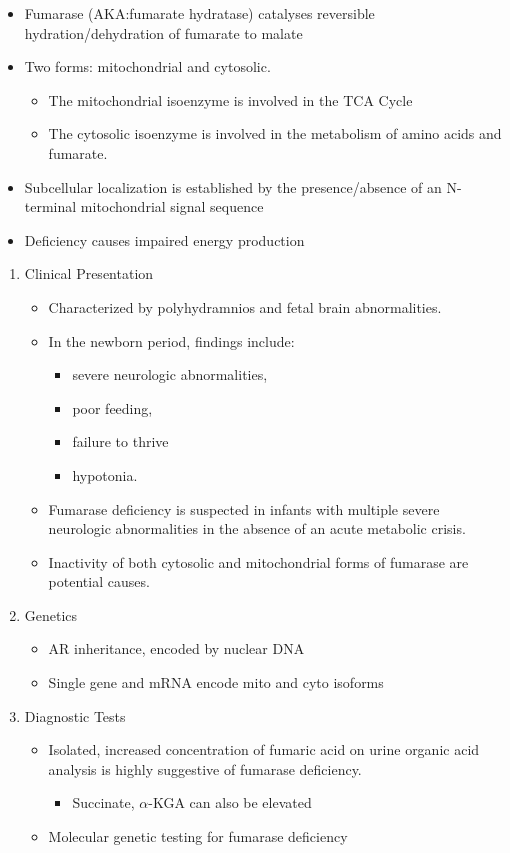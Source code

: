 \documentclass{scrartcl}
\begin{document}
\begin{itemize}
\item Fumarase (AKA:fumarate hydratase) catalyses reversible
hydration/dehydration of fumarate to malate
\end{itemize}
\begin{itemize}
\item Two forms: mitochondrial and cytosolic.
\begin{itemize}
\item The mitochondrial isoenzyme is involved in the TCA Cycle
\item The cytosolic isoenzyme is involved in the metabolism of amino acids and fumarate.
\end{itemize}
\item Subcellular localization is established by the presence/absence of an N-terminal mitochondrial signal
sequence
\item Deficiency causes impaired energy production
\end{itemize}

\begin{enumerate}
\item Clinical Presentation
\label{sec:org51d428d}
\begin{itemize}
\item Characterized by polyhydramnios and fetal brain abnormalities.
\item In the newborn period, findings include:
\begin{itemize}
\item severe neurologic abnormalities,
\item poor feeding,
\item failure to thrive
\item hypotonia.
\end{itemize}
\item Fumarase deficiency is suspected in infants with multiple severe
neurologic abnormalities in the absence of an acute metabolic
crisis.
\item Inactivity of both cytosolic and mitochondrial forms of
fumarase are potential causes.
\end{itemize}
\item Genetics
\label{sec:org98126b3}
\begin{itemize}
\item AR inheritance, encoded by nuclear DNA
\item Single gene and mRNA encode mito and cyto isoforms
\end{itemize}
\item Diagnostic Tests
\label{sec:org720b740}
\begin{itemize}
\item Isolated, increased concentration of fumaric acid on urine organic
acid analysis is highly suggestive of fumarase deficiency.
\begin{itemize}
\item Succinate, \(\alpha\)-KGA can also be elevated
\end{itemize}
\item Molecular genetic testing for fumarase deficiency
\end{itemize}
\end{enumerate}
\end{document}
